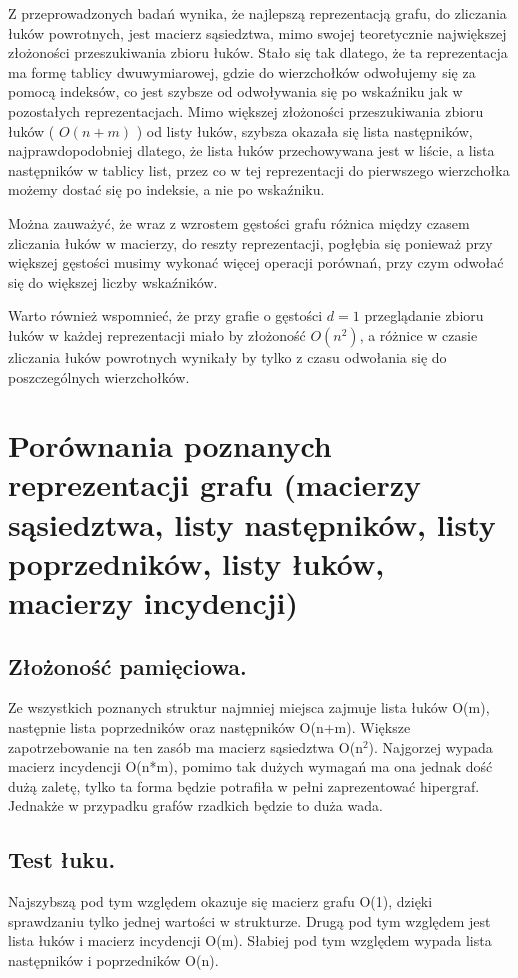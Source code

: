 \documentclass[polish,polish,a4paper]{article}
\begin{document}
\begin{spacing}{1.25}
Z przeprowadzonych badań wynika, że najlepszą reprezentacją grafu, do zliczania łuków powrotnych, jest macierz sąsiedztwa, mimo swojej teoretycznie największej złożoności przeszukiwania zbioru łuków. Stało się tak dlatego, że ta reprezentacja ma formę tablicy dwuwymiarowej, gdzie do wierzchołków odwołujemy się za pomocą indeksów, co jest szybsze od odwoływania się po wskaźniku jak w pozostałych reprezentacjach.
Mimo większej złożoności przeszukiwania zbioru łuków ( $O(n+m)$ ) od listy łuków, szybsza okazała się lista następników, najprawdopodobniej dlatego, że lista łuków przechowywana jest w liście, a lista następników w tablicy list, przez co w tej reprezentacji do pierwszego wierzchołka możemy dostać się po indeksie, a nie po wskaźniku.

Można zauważyć, że wraz z wzrostem gęstości grafu różnica między czasem zliczania łuków w macierzy, do reszty reprezentacji, pogłębia się ponieważ przy większej gęstości musimy wykonać więcej operacji porównań, przy czym odwołać się do większej liczby wskaźników.

Warto również wspomnieć, że przy grafie o gęstości $d=1$ przeglądanie zbioru łuków w każdej reprezentacji miało by złożoność $O(n^2)$, a różnice w czasie zliczania łuków powrotnych wynikały by tylko z czasu odwołania się do poszczególnych wierzchołków.


\section{Porównania poznanych reprezentacji grafu (macierzy sąsiedztwa, listy następników, listy poprzedników, listy łuków, macierzy incydencji)}



\subsection{Złożoność pamięciowa.}
Ze wszystkich poznanych struktur najmniej miejsca zajmuje lista łuków O(m), następnie lista poprzedników oraz następników O(n+m). Większe zapotrzebowanie na ten zasób ma macierz sąsiedztwa O(n$^2$). Najgorzej wypada macierz incydencji O(n*m), pomimo tak dużych wymagań ma ona jednak dość dużą zaletę, tylko ta forma będzie potrafiła w pełni zaprezentować hipergraf. Jednakże w przypadku grafów rzadkich będzie to duża wada.

\subsection{Test łuku.}
Najszybszą pod tym względem okazuje się macierz grafu O(1), dzięki sprawdzaniu tylko jednej wartości w strukturze. Drugą pod tym względem jest lista łuków i macierz incydencji O(m). Słabiej pod tym względem wypada lista następników i poprzedników O(n). 


\end{spacing}
\end{document}
